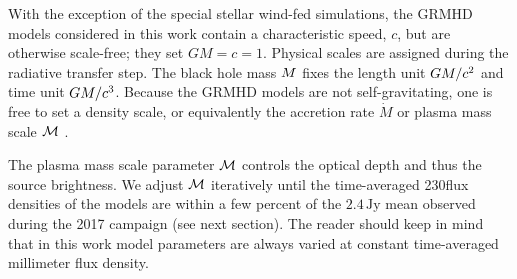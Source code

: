 

With the exception of the special stellar wind-fed simulations, the GRMHD models considered in this work contain a characteristic speed, $c$, but are otherwise scale-free; they set $GM = c = 1$.
Physical scales are assigned during the radiative transfer step.
The black hole mass $M$ fixes the length unit $GM/c^2$ and time unit $GM/c^3$.
Because the GRMHD models are not self-gravitating, one is free to set a density scale, or equivalently the accretion rate $\dot{M}$ or plasma mass scale $\mathcal{M}$ \citep[see, e.g.,][for a full discussion]{Wong_2022}.


The plasma mass scale parameter $\mathcal{M}$ controls the optical depth and thus the source brightness.  We adjust $\mathcal{M}$ iteratively until the time-averaged 230\GHz flux densities of the models are within a few percent of the $2.4\,\mathrm{Jy}$ mean observed during the 2017 campaign (see next section).  The reader should keep in mind that in this work model parameters are always varied at constant time-averaged millimeter flux density.

